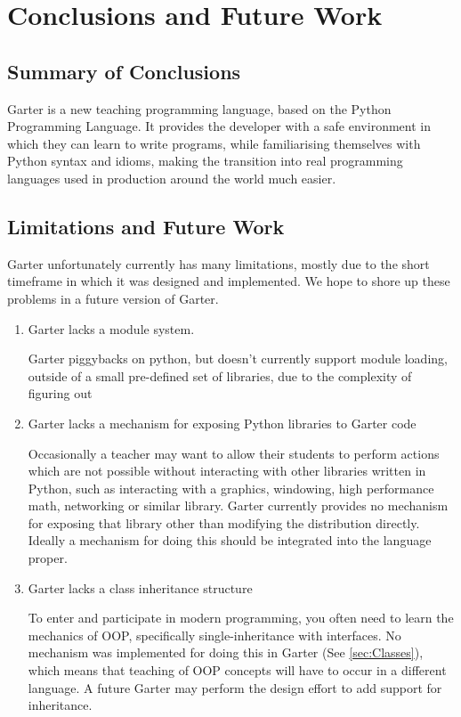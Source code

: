 \glsresetall %
\chapter{Conclusions and Future Work}\label{ch:Conclusion}

\section{Summary of Conclusions}

Garter is a new teaching programming language, based on the Python Programming
Language. It provides the developer with a safe environment in which they can
learn to write programs, while familiarising themselves with Python syntax and
idioms, making the transition into real programming languages used in production
around the world much easier.

\section{Limitations and Future Work}\label{sec:FutureWork}

Garter unfortunately currently has many limitations, mostly due to the short
timeframe in which it was designed and implemented. We hope to shore up these
problems in a future version of Garter.

\begin{enumerate}
\item Garter lacks a module system.

Garter piggybacks on python, but doesn't currently support module loading,
outside of a small pre-defined set of libraries, due to the complexity of
figuring out

\item Garter lacks a mechanism for exposing Python libraries to Garter code

Occasionally a teacher may want to allow their students to perform actions which
are not possible without interacting with other libraries written in Python,
such as interacting with a graphics, windowing, high performance math,
networking or similar library. Garter currently provides no mechanism for
exposing that library other than modifying the distribution directly. Ideally a
mechanism for doing this should be integrated into the language proper.

\item Garter lacks a class inheritance structure

To enter and participate in modern programming, you often need to learn the
mechanics of OOP, specifically single-inheritance with interfaces. No mechanism
was implemented for doing this in Garter (See \ref{sec:Classes}), which means
that teaching of OOP concepts will have to occur in a different language.
A future Garter may perform the design effort to add support for inheritance.


\end{enumerate}


